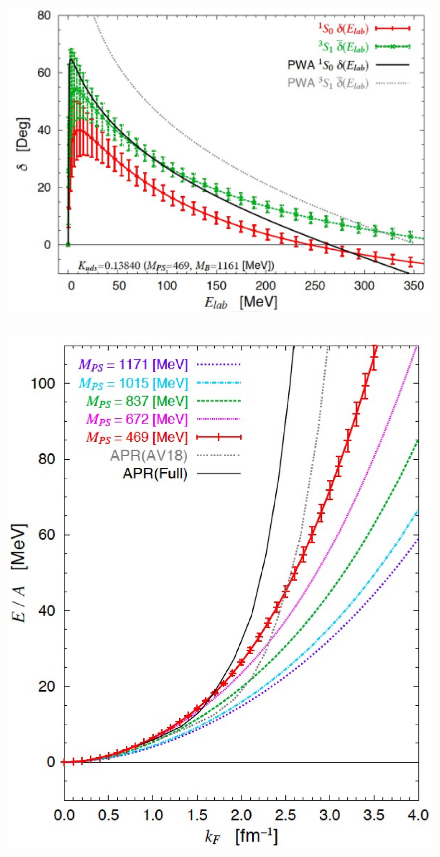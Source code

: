 \begin{figure}[t]
\begin{center}
\includegraphics[scale=0.25]{Chapter3-figures/phase-shift.eps}\ \ \ \ 
\includegraphics[scale=0.27]{Chapter3-figures/neutron-matter.eps}

\end{center}
\end{figure}
